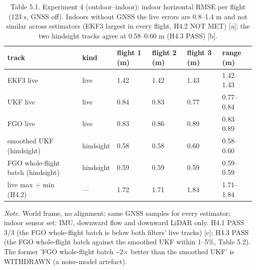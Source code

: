\begin{table}[htbp]
\centering
\footnotesize
\caption{Table 5.1. Experiment 4 (outdoor--indoor): indoor horizontal RMSE per flight (123 s, GNSS off). Indoors without GNSS the live errors are 0.8--1.4 m and not similar across estimators (EKF3 largest in every flight, H4.2 NOT MET) [a]; the two hindsight tracks agree at 0.58--0.60 m (H4.3 PASS) [b].}
\label{tab:5-1}
\begin{tabular}{p{}p{}p{}p{}p{}p{}}
\toprule
\textbf{track} & \textbf{kind} & \textbf{flight 1 (m)} & \textbf{flight 2 (m)} & \textbf{flight 3 (m)} & \textbf{range (m)} \\
\midrule
EKF3 live & live & 1.42 & 1.42 & 1.43 & 1.42--1.43 \\
UKF live & live & 0.84 & 0.83 & 0.77 & 0.77--0.84 \\
FGO live & live & 0.83 & 0.86 & 0.89 & 0.83--0.89 \\
smoothed UKF (hindsight) & hindsight & 0.58 & 0.58 & 0.60 & 0.58--0.60 \\
FGO whole-flight batch (hindsight) & hindsight & 0.59 & 0.59 & 0.59 & 0.59--0.59 \\
live max $\div$ min (H4.2) & --- & 1.72 & 1.71 & 1.84 & 1.71--1.84 \\
\bottomrule
\end{tabular}
\par\smallskip\raggedright
\textit{Note.} World frame, no alignment; same GNSS samples for every estimator; indoor sensor set: IMU, downward flow and downward LiDAR only. H4.1 PASS 3/3 (the FGO whole-flight batch is below both filters' live tracks) [c]; H4.3 PASS (the FGO whole-flight batch against the smoothed UKF within 1--5\%, Table 5.2). The former 'FGO whole-flight batch \textasciitilde{}2$\times$ better than the smoothed UKF' is WITHDRAWN (a noise-model artefact).\par

\end{table}
